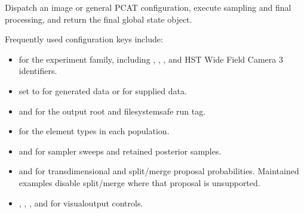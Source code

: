 \documentclass[letterpaper,10pt,english]{sphinxmanual}
\begin{document}
\begin{fulllineitems}
\label{\detokenize{api:pcat.main.sample}}
\pysigstartsignatures
\pysiglinewithargsret
{}
{}
{}
\pysigstopsignatures
\sphinxAtStartPar
Dispatch an image or general PCAT configuration, execute sampling and final
processing, and return the final global state object.

\sphinxAtStartPar
Frequently used configuration keys include:
\begin{itemize}
\item {}
\sphinxAtStartPar
{} for the experiment family, including , ,
, and HST Wide Field Camera 3 identifiers.

\item {}
\sphinxAtStartPar
{} set to  for generated data or  for
supplied data.

\item {}
\sphinxAtStartPar
{} and  for the output root and filesystem\sphinxhyphen{}safe run
tag.

\item {}
\sphinxAtStartPar
{} for the element types in each population.

\item {}
\sphinxAtStartPar
{} and  for sampler sweeps and retained posterior
samples.

\item {}
\sphinxAtStartPar
{} and  for transdimensional and split/merge proposal
probabilities. Maintained examples disable split/merge where that proposal
is unsupported.

\item {}
\sphinxAtStartPar
{}, , , and
 for visual\sphinxhyphen{}output controls.

\end{itemize}

\end{fulllineitems}
\end{document}
